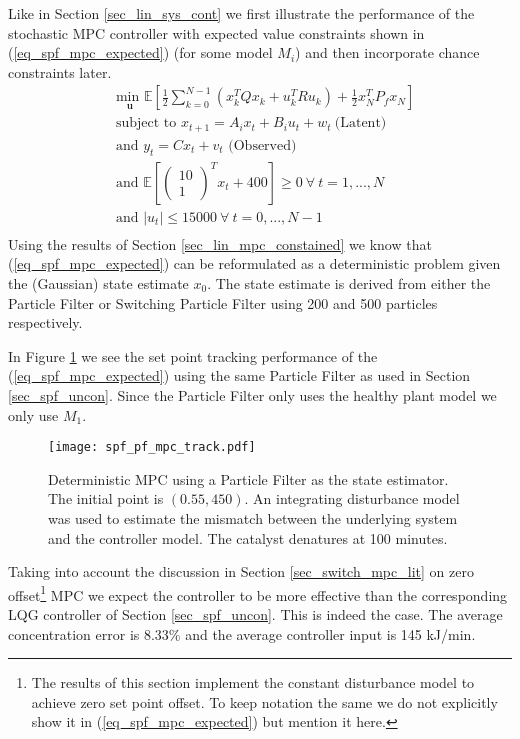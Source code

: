 Like in Section \ref{sec_lin_sys_cont} we first illustrate the performance of the stochastic MPC controller with expected value constraints shown in (\ref{eq_spf_mpc_expected}) (for some model $M_i$) and then incorporate chance constraints later.
\begin{equation}
\begin{aligned}
&\underset{\mathbf{u}}{\text{min }} \mathbb{E}\left[ \frac{1}{2}\sum_{k=0}^{N-1} \left( x_k^TQx_k + u_k^TRu_k \right) + \frac{1}{2}x_N^TP_fx_N \right] \\
& \text{subject to } x_{t+1}=A_ix_t+B_iu_t + w_t~\text{(Latent)} \\
& \text{and } y_{t}= Cx_t + v_t \text{ (Observed)}\\
& \text{and } \mathbb{E}[\begin{pmatrix}
10 \\ 1
\end{pmatrix}^Tx_t + 400] \geq 0 ~\forall ~t=1,...,N \\
& \text{and } |u_t| \leq 15000 ~\forall ~t=0,...,N-1\\
\end{aligned}
\label{eq_spf_mpc_expected}
\end{equation} 
Using the results of Section \ref{sec_lin_mpc_constained} we know that (\ref{eq_spf_mpc_expected}) can be reformulated as a deterministic problem given the (Gaussian) state estimate $x_0$. The state estimate is derived from either the Particle Filter or Switching Particle Filter using 200 and 500 particles respectively.

In Figure \ref{fig_spf_pf_mpc_track} we see the set point tracking performance of the (\ref{eq_spf_mpc_expected}) using the same Particle Filter as used in Section \ref{sec_spf_uncon}. Since the Particle Filter only uses the healthy plant model we only use $M_1$. 
\begin{figure}[H] 
\centering
\texttt{[image: spf\_pf\_mpc\_track.pdf]}
\caption{Deterministic MPC using a Particle Filter as the state estimator. The initial point is $(0.55, 450)$. An integrating disturbance model was used to estimate the mismatch between the underlying system and the controller model. The catalyst denatures at 100 minutes.}
\label{fig_spf_pf_mpc_track}
\end{figure}
Taking into account the discussion in Section \ref{sec_switch_mpc_lit} on zero offset\footnote{The results of this section implement the constant disturbance model to achieve zero set point offset. To keep notation the same we do not explicitly show it in (\ref{eq_spf_mpc_expected}) but mention it here.} MPC we expect the controller to be more effective than the corresponding LQG controller of Section \ref{sec_spf_uncon}. This is indeed the case. The average concentration error is 8.33\% and the average controller input is 145 kJ/min. 

